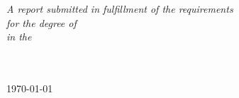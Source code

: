 \documentclass[
    11pt,
    oneside, %
    english,
    singlespacing, %
    headsepline, %
]{MastersDoctoralThesis}
\theoremstyle{definition}
\begin{document}
\begin{titlepage}
\begin{center}
            \vfill
            \large \textit{A report submitted in fulfillment of the requirements\\ for the degree of \degreename}\\[0.3cm] %
            \textit{in the}\\[0.4 cm]
            \facname \\ \deptname\\[2 cm]

            \vfill

            {\large \today}\\[4cm] %

            \vfill
        \end{center}
    \end{titlepage}
\end{document}
